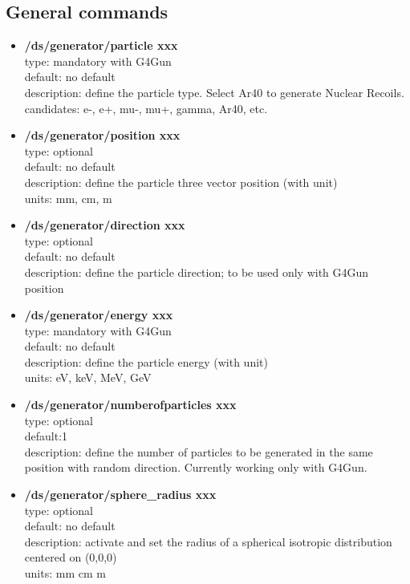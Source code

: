 \documentclass[twocolumn, 10pt]{article}
\begin{document}
\subsection{General commands}
\begin{itemize}

\item \textbf{/ds/generator/particle xxx} \\ 
type: mandatory with G4Gun\\
default: no default\\
description: define the particle type. Select Ar40 to generate Nuclear Recoils.\\
candidates: e-, e+, mu-, mu+, gamma, Ar40, etc.\\

\item \textbf{/ds/generator/position xxx}\\
type: optional \\
default: no default\\
description: define the particle three vector position (with unit)\\
units: mm, cm, m\\

\item \textbf{/ds/generator/direction xxx}\\
type: optional \\
default: no default\\
description: define the particle direction; 
to be used only with G4Gun position\\

\item \textbf{/ds/generator/energy xxx}\\
type: mandatory with G4Gun \\
default: no default\\
description: define the particle energy (with unit)\\
units: eV, keV, MeV, GeV\\

\item \textbf{/ds/generator/numberofparticles xxx}\\
type: optional \\
default:1\\
description: define the number of particles to be generated in the same position with random direction. Currently working only with G4Gun.\\

\item \textbf{/ds/generator/sphere\_radius xxx}\\
type: optional \\
default: no default\\
description: activate and set the radius of a spherical isotropic distribution
centered on (0,0,0)\\
units:  mm cm m\\


\end{itemize}
\end{document}

